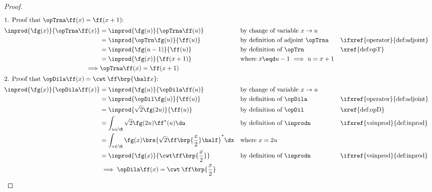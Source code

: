 \begin{proof}
\begin{align*}
  \intertext{1. Proof that $\opTrna\ff(x)=\ff(x+1)$:}
  \inprod{\fg(x)}{\opTrna\ff(x)}
    &= \inprod{\fg(u)}{\opTrna\ff(u)}
    && \text{by change of variable $x\rightarrow u$}
  \\&= \inprod{\opTrn\fg(u)}{\ff(u)}
    && \text{by definition of adjoint $\opTrna$}             && \text{\ifxref{operator}{def:adjoint}}
  \\&= \inprod{\fg(u-1)}{\ff(u)}
    && \text{by definition of $\opTrn$}                      && \text{\xref{def:opT}}
  \\&= \inprod{\fg(x)}{\ff(x+1)}
    && \text{where $x\eqd u-1$ $\implies$ $u=x+1$}
  \\\implies& \opTrna\ff(x) = \ff(x+1)
  \\
  \intertext{2. Proof that $\opDila\ff(x)=\cwt \:\ff\brp{\half x}$:}
  \inprod{\fg(x)}{\opDila\ff(x)}
    &= \inprod{\fg(u)}{\opDila\ff(u)}
    && \text{by change of variable $x\rightarrow u$}   
  \\&= \inprod{\opDil\fg(u)}{\ff(u)}
    && \text{by definition of $\opDila$}                     && \text{\ifxref{operator}{def:adjoint}}
  \\&= \inprod{\sqrt{2}\fg(2u)}{\ff(u)}
    && \text{by definition of $\opDil$}                      && \text{\xref{def:opD}}
  \\&= \int_{u\in\R} \sqrt{2}\fg(2u) \ff^\ast(u) \du
    && \text{by definition of $\inprodn$}                    && \text{\ifxref{vsinprod}{def:inprod}}
  \\&= \int_{x\in\R} \fg(x) \brs{\sqrt{2}\ff\brp{\frac{x}{2}} \half }^\ast \dx
    && \text{where $x=2u$}
  \\&= \inprod{\fg(x)}{\cwt  \ff\brp{\frac{x}{2}}}
    && \text{by definition of $\inprodn$}                    && \text{\ifxref{vsinprod}{def:inprod}}
  \\&\implies \opDila\ff(x)=\cwt \:\ff\brp{\frac{x}{2}}
\end{align*}
\end{proof}

